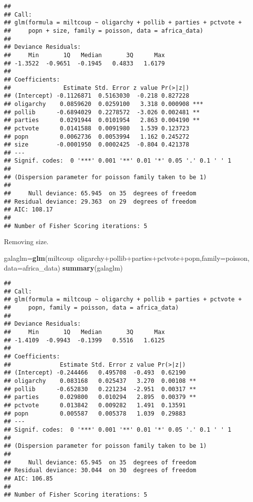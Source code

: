 \documentclass[11pt,]{article}
\newenvironment{Shaded}{\begin{snugshade}}{\end{snugshade}}
\newcommand{\KeywordTok}[1]{\textcolor[rgb]{0.13,0.29,0.53}{\textbf{{#1}}}}
\newcommand{\DataTypeTok}[1]{\textcolor[rgb]{0.13,0.29,0.53}{{#1}}}
\newcommand{\NormalTok}[1]{{#1}}
\begin{document}
\begin{verbatim}
## 
## Call:
## glm(formula = miltcoup ~ oligarchy + pollib + parties + pctvote + 
##     popn + size, family = poisson, data = africa_data)
## 
## Deviance Residuals: 
##     Min       1Q   Median       3Q      Max  
## -1.3522  -0.9651  -0.1945   0.4833   1.6179  
## 
## Coefficients:
##               Estimate Std. Error z value Pr(>|z|)    
## (Intercept) -0.1126871  0.5163030  -0.218 0.827228    
## oligarchy    0.0859620  0.0259100   3.318 0.000908 ***
## pollib      -0.6894029  0.2278572  -3.026 0.002481 ** 
## parties      0.0291944  0.0101954   2.863 0.004190 ** 
## pctvote      0.0141588  0.0091980   1.539 0.123723    
## popn         0.0062736  0.0053994   1.162 0.245272    
## size        -0.0001950  0.0002425  -0.804 0.421378    
## ---
## Signif. codes:  0 '***' 0.001 '**' 0.01 '*' 0.05 '.' 0.1 ' ' 1
## 
## (Dispersion parameter for poisson family taken to be 1)
## 
##     Null deviance: 65.945  on 35  degrees of freedom
## Residual deviance: 29.363  on 29  degrees of freedom
## AIC: 108.17
## 
## Number of Fisher Scoring iterations: 5
\end{verbatim}

Removing size.

\begin{Shaded}
\begin{Highlighting}[]
\NormalTok{galaglm=}\KeywordTok{glm}\NormalTok{(miltcoup~oligarchy+pollib+parties+pctvote+popn,}\DataTypeTok{family=}\NormalTok{poisson,}\DataTypeTok{data=}\NormalTok{africa_data)}
\KeywordTok{summary}\NormalTok{(galaglm)}
\end{Highlighting}
\end{Shaded}

\begin{verbatim}
## 
## Call:
## glm(formula = miltcoup ~ oligarchy + pollib + parties + pctvote + 
##     popn, family = poisson, data = africa_data)
## 
## Deviance Residuals: 
##     Min       1Q   Median       3Q      Max  
## -1.4109  -0.9943  -0.1399   0.5516   1.6125  
## 
## Coefficients:
##              Estimate Std. Error z value Pr(>|z|)   
## (Intercept) -0.244466   0.495708  -0.493  0.62190   
## oligarchy    0.083168   0.025437   3.270  0.00108 **
## pollib      -0.652830   0.221234  -2.951  0.00317 **
## parties      0.029800   0.010294   2.895  0.00379 **
## pctvote      0.013842   0.009282   1.491  0.13591   
## popn         0.005587   0.005378   1.039  0.29883   
## ---
## Signif. codes:  0 '***' 0.001 '**' 0.01 '*' 0.05 '.' 0.1 ' ' 1
## 
## (Dispersion parameter for poisson family taken to be 1)
## 
##     Null deviance: 65.945  on 35  degrees of freedom
## Residual deviance: 30.044  on 30  degrees of freedom
## AIC: 106.85
## 
## Number of Fisher Scoring iterations: 5
\end{verbatim}
\end{document}
